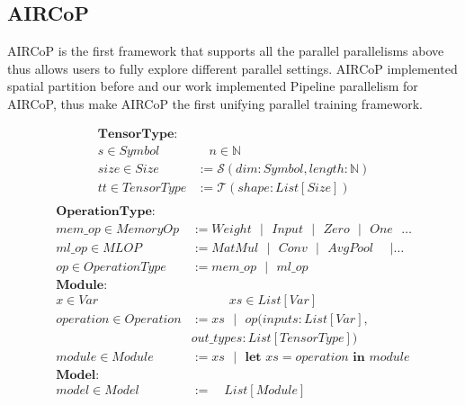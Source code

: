 \documentclass[sigplan]{acmart}\settopmatter{printfolios=true,printccs=false,printacmref=false}
\begin{document}
\subsection{AIRCoP}
 AIRCoP \cite{aircopfeiwang} is the first framework that supports all the parallel parallelisms above thus allows users to fully explore different parallel settings. AIRCoP implemented spatial partition before and our work implemented Pipeline parallelism for AIRCoP, thus make AIRCoP the first unifying parallel training framework.\par
\begin{align*}\label{formalsyntax}
  \textbf{TensorType}:& \\
  s \in Symbol& \quad n  \in \mathbb{N} \\
  size \in Size& :=\mathcal{S}(dim:Symbol,length:\mathbb{N})\\
  tt\in TensorType& := \mathcal{T}(shape:List[Size])\\
\end{align*}
\begin{align*}
  \textbf{OperationType}:& \\
  mem\_op\in MemoryOp& := Weight \text{ } | \text{ } Input \text{ } | \text{ } Zero \text{ } | \text{ } One \text{ } \dots \\
  ml\_op \in MLOP& := MatMul \text{ } | \text{ } Conv \text{ } | \text{ } AvgPool \text{ }\text{ } | \dots \\
  op \in OperationType&:= mem\_op \text{ } | \text{ } ml\_op \\
  \textbf{Module}:& \\
  x \in Var& \quad \quad \quad xs \in List[Var]\\
  operation \in Operation&:= xs \text{ } | \text{ } op(inputs: List[Var], \\
  & out\_types:List[TensorType]) \\
  module \in Module&:=xs \text{ } | \text{ } \textbf{let } xs=operation \textbf{ in } module \\
  \textbf{Model}:&\\
  model \in Model&:= \quad List[Module]
\end{align*}
\end{document}
